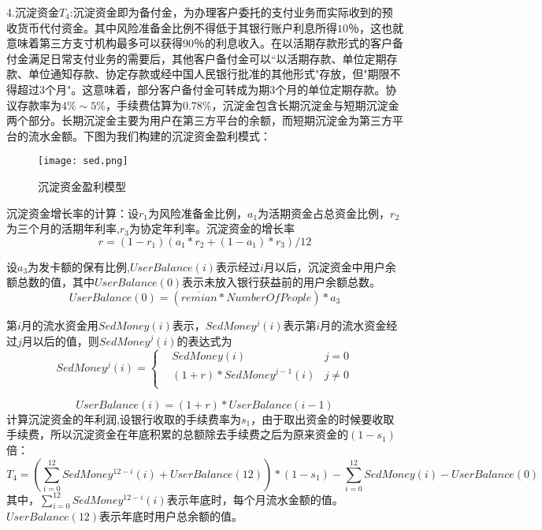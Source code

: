 \documentclass[withoutpreface,bwprint]{cumcmthesis} %
\begin{document}
4.沉淀资金$T_4$:沉淀资金即为备付金，为办理客户委托的支付业务而实际收到的预收货币代付资金。其中风险准备金比例不得低于其银行账户利息所得$10$％，这也就意味着第三方支寸机构最多可以获得$90$％的利息收入。在以活期存款形式的客户备付金满足日常支付业务的需要后，其他客户备付金可以“以活期存款、单位定期存款、单位通知存款、协定存款或经中国人民银行批准的其他形式"存放，但"期限不得超过3个月"。这意味着，部分客户备付金可转成为期3个月的单位定期存款。协议存款率为$4\%\sim5\%$，手续费估算为$0.78\%$，沉淀金包含长期沉淀金与短期沉淀金两个部分。长期沉淀金主要为用户在第三方平台的余额，而短期沉淀金为第三方平台的流水金额。下图为我们构建的沉淀资金盈利模式：

\begin{figure}[h]
\centering
\texttt{[image: sed.png]}
\caption{沉淀资金盈利模型}
\end{figure}

沉淀资金增长率的计算：设$r_1$为风险准备金比例，$a_1$为活期资金占总资金比例，$r_2$为三个月的活期年利率,$r_3$为协定年利率。沉淀资金的增长率
\begin{equation}
r=(1-r_1)(a_1*r_2+(1-a_1)*r_3)/12
\end{equation}

设$a_3$为发卡额的保有比例,$UserBalance(i)$表示经过$i$月以后，沉淀资金中用户余额总数的值，其中$UserBalance(0)$表示未放入银行获益前的用户余额总数。
\begin{equation}
UserBalance(0)=(\overline {remian} * {NumberOfPeople})*a_3
\end{equation}

第$i$月的流水资金用$SedMoney(i)$表示，$SedMoney^j(i)$表示第$i$月的流水资金经过$j$月以后的值，则$SedMoney^j(i)$的表达式为
\begin{equation}
SedMoney^j(i)=\left\{
\begin{aligned}
&SedMoney(i)  & j=0\\
&(1+r)*SedMoney^{j-1}(i)  & j\neq0\\
\end{aligned}
\right.
\end{equation}

\begin{equation}
UserBalance(i)=(1+r)*UserBalance(i-1)
\end{equation}
计算沉淀资金的年利润,设银行收取的手续费率为$s_1$，由于取出资金的时候要收取手续费，所以沉淀资金在年底积累的总额除去手续费之后为原来资金的$(1-s_1)$倍：
\begin{equation}
T_4=(\sum_{i=0}^{12} SedMoney^{12-i}(i)+UserBalance(12))*(1-s_1)-\sum_{i=0}^{12} SedMoney(i)-UserBalance(0)
\end{equation}
其中，$\sum_{i=0}^{12} SedMoney^{12-i}(i)$表示年底时，每个月流水金额的值。$UserBalance(12)$表示年底时用户总余额的值。
\end{document}
